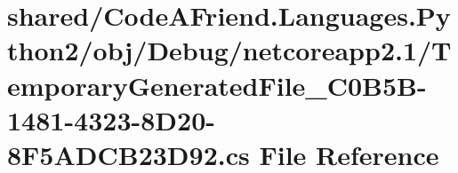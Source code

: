 \hypertarget{shared_2_code_a_friend_8_languages_8_python2_2obj_2_debug_2netcoreapp2_81_2_temporary_generated_8326a966f5765670c7d59c0c1b696631}{}\section{shared/\+Code\+A\+Friend.Languages.\+Python2/obj/\+Debug/netcoreapp2.1/\+Temporary\+Generated\+File\+\_\+C0\+B5\+B-\/1481-\/4323-\/8\+D20-\/8\+F5\+A\+D\+C\+B23\+D92.cs File Reference}
\label{shared_2_code_a_friend_8_languages_8_python2_2obj_2_debug_2netcoreapp2_81_2_temporary_generated_8326a966f5765670c7d59c0c1b696631}
